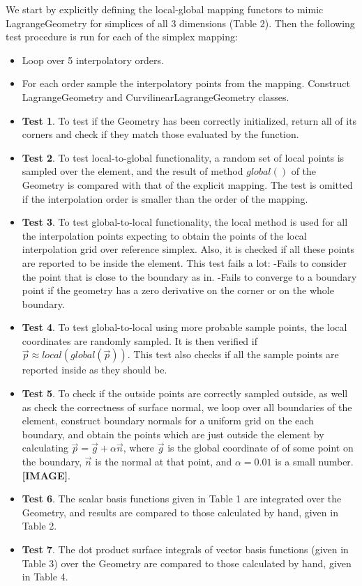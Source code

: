 \documentclass[12pt]{article}
\begin{document}
We start by explicitly defining the local-global mapping functors to mimic LagrangeGeometry for simplices of all 3 dimensions (Table 2). Then the following test procedure is run for each of the simplex mapping:
\begin{itemize}
	\item Loop over 5 interpolatory orders.
	\item For each order sample the interpolatory points from the mapping. Construct LagrangeGeometry and CurvilinearLagrangeGeometry classes.
	\item \textbf{Test 1}. To test if the Geometry has been correctly initialized, return all of its corners and check if they match those evaluated by the function.
	\item \textbf{Test 2}. To test local-to-global functionality, a random set of local points is sampled over the element, and the result of method $global()$ of the Geometry is compared with that of the explicit mapping. The test is omitted if the interpolation order is smaller than the order of the mapping.
	\item \textbf{Test 3}. To test global-to-local functionality, the local method is used for all the interpolation points expecting to obtain the points of the local interpolation grid over reference simplex. Also, it is checked if all these points are reported to be inside the element. This test fails a lot:
		\subitem -Fails to consider the point that is close to the boundary as in.
		\subitem -Fails to converge to a boundary point if the geometry has a zero derivative on the corner or on the whole boundary.
	\item \textbf{Test 4}. To test global-to-local using more probable sample points, the local coordinates are randomly sampled. It is then verified if $\vec{p} \approx local(global(\vec{p}))$. This test also checks if all the sample points are reported inside as they should be.
	\item \textbf{Test 5}. To check if the outside points are correctly sampled outside, as well as check the correctness of surface normal, we loop over all boundaries of the element, construct boundary normals for a uniform grid on the each boundary, and obtain the points which are just outside the element by calculating $\vec{p} = \vec{g} + \alpha \vec{n}$, where $\vec{g}$ is the global coordinate of of some point on the boundary, $\vec{n}$ is the normal at that point, and $\alpha = 0.01$ is a small number. \textbf{[IMAGE]}.
	\item \textbf{Test 6}. The scalar basis functions given in Table 1 are integrated over the Geometry, and results are compared to those calculated by hand, given in Table 2.
	\item \textbf{Test 7}. The dot product surface integrals of vector basis functions (given in Table 3) over the Geometry are compared to those calculated by hand, given in Table 4.
\end{itemize}
\end{document}
